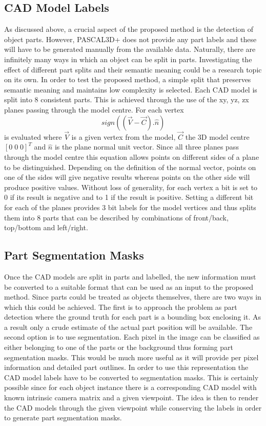 \documentclass[main.tex]{subfiles}
\begin{document}
\subsection{CAD Model Labels}
\label{subsection: cadmodellabels}
As discussed above, a crucial aspect of the proposed method is the detection of object parts. However, PASCAL3D+ does not provide any part labels and these will have to be generated manually from the available data. Naturally, there are infinitely many ways in which an object can be split in parts. Investigating the effect of different part splits and their semantic meaning could be a research topic on its own. In order to test the proposed method, a simple split that preserves semantic meaning and maintains low complexity is selected. Each CAD model is split into 8 consistent parts. This is achieved through the use of the xy, yz, zx planes passing through the model centre. For each vertex
\begin{equation}
sign((\vec{V}-\vec{C}).\hat{n})
\end{equation}
is evaluated where $\vec{V}$ is a given vertex from the model, $\vec{C}$ the 3D model centre $[0 \; 0 \; 0]^T$ and $\hat{n}$ is the plane normal unit vector. Since all three planes pass through the model centre this equation allows points on different sides of a plane to be distinguished. Depending on the definition of the normal vector, points on one of the sides will give negative results whereas points on the other side will produce positive values. Without loss of generality, for each vertex a bit is set to 0 if its result is negative and to 1 if the result is positive. Setting a different bit for each of the planes provides 3 bit labels for the model vertices and thus splits them into 8 parts that can be described by combinations of front/back, top/bottom and left/right.
\subsection{Part Segmentation Masks}
Once the CAD models are split in parts and labelled, the new information must be converted to a suitable format that can be used as an input to the proposed method. Since parts could be treated as objects themselves, there are two ways in which this could be achieved. The first is to approach the problem as part detection where the ground truth for each part is a bounding box enclosing it. As a result only a crude estimate of the actual part position will be available. The second option is to use segmentation. Each pixel in the image can be classified as either belonging to one of the parts or the background thus forming part segmentation masks. This would be much more useful as it will provide per pixel information and detailed part outlines. In order to use this representation the CAD model labels have to be converted to segmentation masks. This is certainly possible since for each object instance there is a corresponding CAD model with known intrinsic camera matrix and a given viewpoint. The idea is then to render the CAD models through the given viewpoint while conserving the labels in order to generate part segmentation masks.
\end{document}
